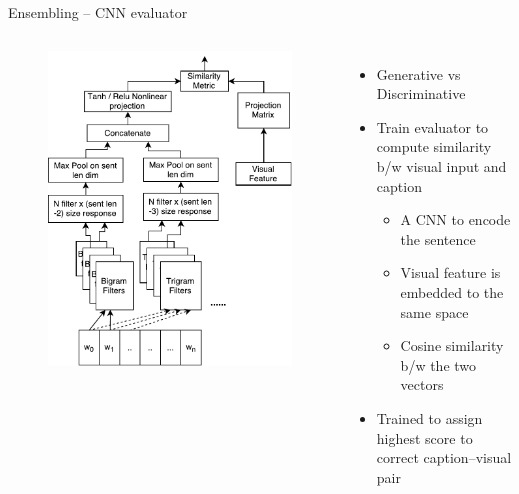 \documentclass{beamer}
\begin{document}
\begin{frame}{Ensembling -- CNN evaluator}
\begin{columns}       
    \begin{figure}[h]
        \centering
        \includegraphics[width=1.0\textwidth]{images/CnnEval.pdf}
        \vfill
    \end{figure}
    \begin{itemize}
        \item Generative vs Discriminative 
        \item Train evaluator to compute similarity b/w visual input and caption 
           \begin{itemize}
               \item A CNN to encode the sentence 
               \item Visual feature is embedded to the same space 
               \item Cosine similarity b/w the two vectors 
           \end{itemize}
        \item Trained to assign highest score to correct caption--visual pair 
    \end{itemize}
\end{columns}
\end{frame}
\end{document}

